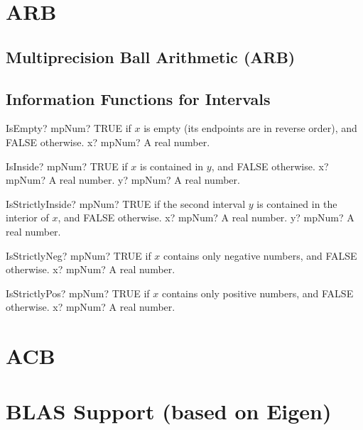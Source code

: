 \documentclass[12pt,a4paper,openany]{book}
\begin{document}
\chapter{ARB}

\section{Multiprecision Ball Arithmetic (ARB)}

\section{Information Functions for Intervals}

\begin{mpFunctionsExtract}
\mpFunctionOne
{IsEmpty? mpNum? TRUE  if $x$ is empty (its endpoints are in reverse order), and FALSE otherwise.}
{x? mpNum? A real number.}
\end{mpFunctionsExtract}

\begin{mpFunctionsExtract}
\mpFunctionTwo
{IsInside? mpNum? TRUE  if $x$ is contained in $y$, and FALSE otherwise.}
{x? mpNum? A real number.}
{y? mpNum? A real number.}
\end{mpFunctionsExtract}

\begin{mpFunctionsExtract}
\mpFunctionTwo
{IsStrictlyInside? mpNum? TRUE  if the second interval $y$ is contained in the interior of $x$, and FALSE otherwise.}
{x? mpNum? A real number.}
{y? mpNum? A real number.}
\end{mpFunctionsExtract}

\begin{mpFunctionsExtract}
\mpFunctionOne
{IsStrictlyNeg? mpNum? TRUE if $x$ contains only negative numbers, and FALSE otherwise.}
{x? mpNum? A real number.}
\end{mpFunctionsExtract}

\begin{mpFunctionsExtract}
\mpFunctionOne
{IsStrictlyPos? mpNum? TRUE if $x$ contains only positive numbers, and FALSE otherwise.}
{x? mpNum? A real number.}
\end{mpFunctionsExtract}

\chapter{ACB}

\chapter{BLAS Support (based on Eigen)}
\end{document}
